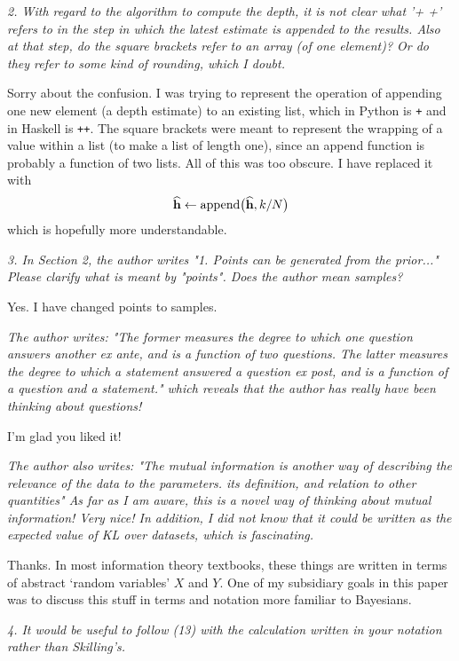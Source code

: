 \documentclass[a4paper, 12pt]{article}
\renewcommand{\quote}{\em \color{orange}}
\begin{document}
{\quote
2. With regard to the algorithm to compute the depth, it is not clear what '+ +' refers to in the step in which the latest estimate is appended to the results.  Also at that step, do the square brackets refer to an array (of one element)?  Or do they refer to some kind of rounding, which I doubt.}

Sorry about the confusion. I was trying to represent the operation of
appending one new element (a depth estimate)
to an existing list, which in Python is {\tt +}
and in Haskell is {\tt ++}. The square brackets were meant to represent
the wrapping of a value within a list (to make a list of length one),
since an append function is probably a function of two lists.
All of this was too obscure. I have replaced it with
\begin{align}
\widehat{\mathbf{h}} \leftarrow \textnormal{append}\big(\widehat{\mathbf{h}}, k/N\big)
\end{align}
which is hopefully more understandable.

{\quote
3. In Section 2, the author writes "1. Points can be generated from the prior..."  Please clarify what is meant by "points".  Does the author mean samples?}

Yes. I have changed points to samples.

{\quote
The author writes:
"The former measures the degree to which one question answers another ex ante, and is a function of two questions. The latter measures the degree to which a statement answered a question ex post, and is a function of a question and a statement."
which reveals that the author has really have been thinking about questions!}

I'm glad you liked it!

{\quote
The author also writes:
"The mutual information is another way of describing the relevance of the data to the parameters. its definition, and relation to other quantities"
As far as I am aware, this is a novel way of thinking about mutual information!  Very nice!
In addition, I did not know that it could be written as the expected value of KL over datasets, which is fascinating.}

Thanks. In most information theory textbooks, these things are written in
terms of abstract `random variables' $X$ and $Y$. One of my subsidiary
goals in this paper was to discuss this stuff in terms and notation more
familiar to Bayesians.

{\quote
4. It would be useful to follow (13) with the calculation written in your notation rather than Skilling's.}
\end{document}
